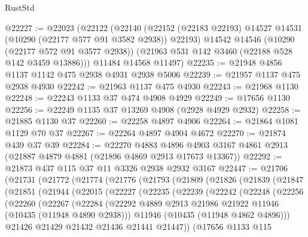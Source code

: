 \begin{lexlean}{RustStd}
\begin{coremodule}
{\begin{coremodule}
{{{{{{{{{{{{{{{{{{{{{{{{{{{{{{{{{{{{{{{{{{{{{{{{{{{{{{{{{{{{{{{{{{{{{{{{{{{{{{@22227 := @22023
    (@22122
      (@22140
        (@22152 (@22183 @22193) @14527 @14531 (@10290 (@22177 @577 @91 @3582 @2938)) @22193)
        @14542
        @14546
        (@10290 (@22177 @572 @91 @3577 @2938))
        (@21963 @531 @142 @3460 (@22188 @528 @142 @3459 @13886)))
      @11484
      @14568
      @11497)
@22235 := @21948 @4856 @1137 @1142 @475 @2938 @4931 @2938 @5006
@22239 := @21957 @1137 @475 @2938 @4930
@22242 := @21963 @1137 @475 @4930
@22243 := @21968 @1130
@22248 := @22243 @1133 @37 @474 @4908 @4929
@22249 := @17656 @1130
@22256 := @22249 @1135 @37 @13269 @4908 (@2928 @4929 @2932)
@22258 := @21885 @1130 @37
@22260 := @22258 @4897 @4906
@22264 := @21864 @1081 @1129 @70 @37
@22267 := @22264 @4897 @4904 @4672
@22270 := @21874 @439 @37 @39
@22284 := @22270
    @4883
    @4896
    @4903
    @3167
    @4861
    @2913
    (@21887 @4879 @4881 (@21896 @4869 @2913 @17673 @13367))
@22292 := @21873 @437 @115 @37 @11 @3326 @2938 @2932 @3167
@22447 := @21706
    (@21731
      (@21772
        (@21774
          (@21776
            (@21793
              (@21809
                (@21826
                  (@21839
                    (@21847
                      (@21851
                        (@21944
                          (@22015
                            (@22227
                              (@22235
                                (@22239
                                  (@22242
                                    (@22248
                                      (@22256
                                        (@22260
                                          (@22267
                                            (@22284
                                              (@22292
                                                @4889
                                                @2913
                                                @21986
                                                @21922
                                                @11946
                                                (@10435 (@11948 @4890 @2938)))
                                              @11946
                                              (@10435 (@11948 @4862 @4896)))
                                            @21426
                                            @21429
                                            @21432
                                            @21436
                                            @21441
                                            @21447))
                                        (@17656
                                          @1133
                                          @115
}}}}}}}}}}}}}}}}}}}}}}}}}}}}}}}}}}}}}}}}}}}}}}}}}}}}}}}}}}}}}}}}}}}}}}}}}}}}}}
\end{coremodule}}
\end{coremodule}
\end{lexlean}
